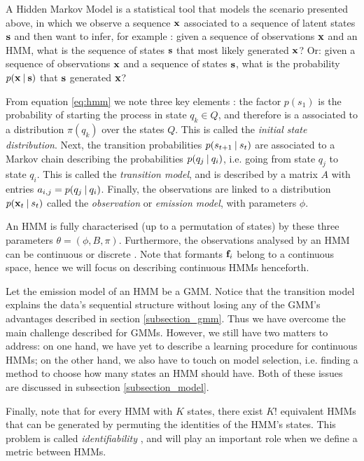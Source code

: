 \documentclass[../main.tex]{subfiles}
\begin{document}
\par A Hidden Markov Model is a statistical tool that models the scenario presented above, in which we observe a sequence $\mathbf{x}$ associated to a sequence of latent states $\mathbf{s}$ and then want to infer, for example \cite{Jurafsky2009, Bishop2006}: given a sequence of observations $\mathbf{x}$ and an HMM, what is the sequence of states $\mathbf{s}$ that most likely generated $\mathbf{x}$? Or: given a sequence of observations $\mathbf{x}$ and a sequence of states $\mathbf{s}$, what is the probability $p(\mathbf{x} \:\vert\: \mathbf{s})$ that $\mathbf{s}$ generated $\mathbf{x}$?  
\par From equation \ref{eq:hmm} we note three key elements \cite{Ghahramani2001}: the factor $p(s_1)$ is the probability of starting the process in state $q_k \in Q$, and therefore is a associated to a distribution $\pi(q_k)$ over the states $Q$. This is called the \emph{initial state distribution}. Next, the transition probabilities $p(s_{t+1} \:\vert\: s_t)$ are associated to a Markov chain describing the probabilities $p(q_j \:\vert\: q_i)$, i.e. going from state $q_j$ to state $q_i$. This is called the \emph{transition model}, and is described by a matrix $A$ with entries $a_{i,j} = p(q_j \:\vert\: q_i)$. Finally, the observations are linked to a distribution $p(\mathbf{x}_t \:\vert\: s_t)$ called the \emph{observation} or \emph{emission model}, with parameters $\phi$. 
\par An HMM is fully characterised (up to a permutation of states) by these three parameters $\theta = (\phi, B, \pi)$. Furthermore, the observations analysed by an HMM can be continuous or discrete \cite{Jurafsky2009}. Note that formants $\mathbf{f}_i$ belong to a continuous space, hence we will focus on describing continuous HMMs henceforth.
\par Let the emission model of an HMM be a GMM. Notice that the transition model explains the data's sequential structure without losing any of the GMM's advantages described in section \ref{subsection_gmm}. Thus we have overcome the main challenge described for GMMs. However, we still have two matters to address: on one hand, we have yet to describe a learning procedure for continuous HMMs; on the other hand, we also have to touch on model selection, i.e. finding a method to choose how many states an HMM should have. Both of these issues are discussed in subsection \ref{subsection_model}.
\par Finally, note that for every HMM with $K$ states, there exist $K!$ equivalent HMMs that can be generated by permuting the identities of the HMM's states. This problem is called \emph{identifiability} \cite{Bishop2006}, and will play an important role when we define a metric between HMMs. 
\end{document}
